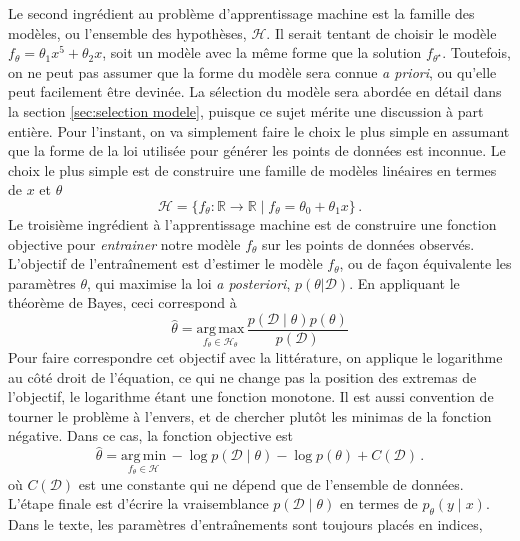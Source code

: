 Le second ingrédient au problème d'apprentissage machine est la famille des modèles, ou l'ensemble des hypothèses, $\mathcal{H}$. 
Il serait tentant de choisir le modèle $f_\theta = \theta_1 x^{5} + \theta_2 x$, soit un modèle avec la même forme que la solution 
$f_{\theta^{\star}}$. Toutefois, on ne peut pas assumer que la forme du modèle sera connue \textit{a priori}, 
ou qu'elle peut facilement être devinée. La sélection du modèle sera abordée en détail dans la section \ref{sec:selection modele}, 
puisque ce sujet mérite une discussion à part entière.
Pour l'instant, on va simplement faire le choix le plus simple en assumant que la forme de 
la loi utilisée pour générer les points de données est inconnue. 
Le choix le plus simple est de construire une famille de modèles linéaires en termes de $x$ et $\theta$
\begin{equation}\label{eq:modele lineaire}
        \mathcal{H} = \{f_\theta:\mathbb{R} \rightarrow  \mathbb{R} \mid f_\theta = \theta_0 + \theta_1 x\}\, . 
\end{equation} 
Le troisième ingrédient à l'apprentissage machine est de construire une fonction objective pour \textit{entrainer} notre modèle $f_\theta$ sur les points 
de données observés. 
L'objectif de l'entraînement est d'estimer le modèle $f_\theta$, ou de façon équivalente les paramètres $\theta$, qui maximise la loi \textit{a posteriori}, $p(\theta | \mathcal{D})$. En appliquant 
le théorème de Bayes, ceci correspond à
\begin{equation}
        \hat{\theta} = \underset{f_\theta \in \mathcal{H}_\theta}{\mathrm{arg\, max}}\, \frac{p(\mathcal{D} \mid \theta) p(\theta)}{p(\mathcal{D})}
\end{equation} 
Pour faire correspondre cet objectif avec la littérature, on applique le logarithme au côté droit de l'équation, ce qui ne change pas la position des extremas de 
l'objectif, le logarithme étant une fonction monotone. Il est aussi convention de tourner le problème à l'envers, et de chercher plutôt les minimas de la fonction négative. Dans 
ce cas, la fonction objective est
\begin{equation}
        \hat{\theta} = \underset{f_\theta \in \mathcal{H}}{\mathrm{arg\, min}}\, -\log p(\mathcal{D} \mid \theta) - \log p(\theta) + C(\mathcal{D})\, .
\end{equation} 
où $C(\mathcal{D})$ est une constante qui ne dépend que de l'ensemble de données. L'étape finale est d'écrire la vraisemblance $p(\mathcal{D} \mid \theta)$ 
en termes de $p_\theta( y \mid x)$. Dans le texte, les paramètres d'entraînements sont toujours placés en indices, 
